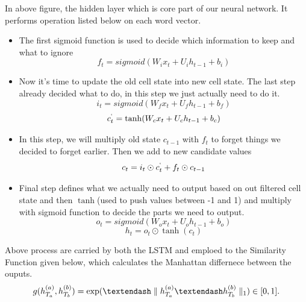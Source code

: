 In above figure, the hidden layer which is core part of our neural network. It performs operation listed below on each word vector.
\begin{itemize}
\item The first sigmoid function is used to decide which information to keep and what to ignore
$$f_t=sigmoid(W_ix_t + U_ih_{t-1}+b_i)$$
\item Now it's time to update the old cell state into new cell state. The last step already decided what to do, in this step we just actually need to do it.
$$i_t=sigmoid(W_fx_t + U_fh_{t-1}+b_f)$$
$$c_t^`=\tanh(W_cx_t + U_ch_{t-1}+b_c)$$
\item In this step, we will multiply old state $c_{t-1}$ with $f_t$ to forget things we decided to forget earlier. Then we add to new candidate values
$$c_t=i_t \odot c_t^` + f_t \odot c_{t-1}$$
\item Final step defines what we actually need to output based on out filtered cell state and then $\tanh$(used to push values between -1 and 1) and multiply with sigmoid function to decide the parts we need to output.
$$o_t=sigmoid(W_ox_t + U_oh_{t-1}+b_o)$$
$$h_t=o_t \odot \tanh(c_t)$$
\end{itemize}

Above process are carried by both the LSTM and emploed to the Similarity Function given below, which calculates the Manhattan differnece between the ouputs.
$$g(h_{T_a}^{(a)},h_{T_b}^{(b)})=\exp(\textendash \parallel h_{T_a}^{(a)} \textendash h_{T_b}^{(b)}\parallel_1) \in [0,1]. $$
